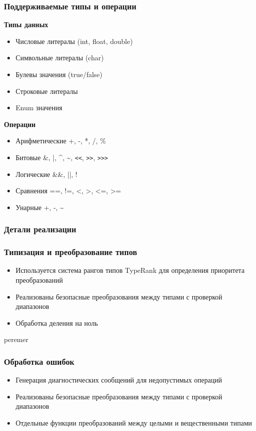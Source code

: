 \subsubsection{Поддерживаемые типы и операции}
\textbf{Типы данных}
\begin{itemize}[label={--}]
    \item Числовые литералы (int, float, double)
    \item Символьные литералы (char)
    \item Булевы значения (true/false)
    \item Строковые литералы
    \item Enum значения
\end{itemize}

\textbf{Операции}
\begin{itemize}[label={--}]
    \item Арифметические  +, -, *, /, \%
    \item Битовые  \&, |, \^{}, \~{}, \verb|<<|, \verb|>>|, \verb|>>>|
    \item Логические  \&\&, ||, !
    \item Сравнения  ==, !=, <, >, <=, >=
    \item Унарные  +, -, \~{}
\end{itemize}

\subsubsection{Детали реализации}
\subsubsection*{Типизация и преобразование типов}
\begin{itemize}[label={--}]
    \item Используется система рангов типов TypeRank для определения приоритета преобразований
    \item Реализованы безопасные преобразования между типами с проверкой диапазонов
    \item Обработка деления на ноль
\end{itemize}

peremer

\subsubsection*{Обработка ошибок}
\begin{itemize}[label={--}]
    \item Генерация диагностических сообщений для недопустимых операций
    \item Реализованы безопасные преобразования между типами с проверкой диапазонов
    \item Отдельные функции преобразований между целыми и вещественными типами
\end{itemize}

